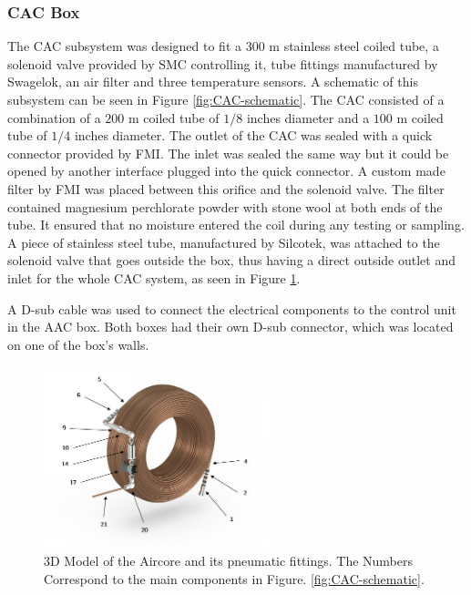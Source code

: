 \subsubsection{CAC Box}

The CAC subsystem was designed to fit a $300$ m stainless steel coiled tube, a solenoid valve provided by SMC controlling it, tube fittings manufactured by Swagelok, an air filter and three temperature sensors. A schematic of this subsystem can be seen in Figure \ref{fig:CAC-schematic}. The CAC consisted of a combination of a $200$ m coiled tube of $1/8$ inches diameter and a $100$ m coiled tube of $1/4$ inches diameter. The outlet of the CAC was sealed with a quick connector provided by FMI. The inlet was sealed the same way but it could be opened by another interface plugged into the quick connector. A custom made filter by FMI was placed between this orifice and the solenoid valve. The filter contained magnesium perchlorate powder with stone wool at both ends of the tube. It ensured that no moisture entered the coil during any testing or sampling. A piece of stainless steel tube, manufactured by Silcotek, was attached to the solenoid valve that goes outside the box, thus having a direct outside outlet and inlet for the whole CAC system, as seen in Figure \ref{fig:CAC-cad-model}.

A D-sub cable was used to connect the electrical components to the control unit in the AAC box. Both boxes had their own D-sub connector, which was located on one of the box's walls.


\begin{figure}[H]
    \centering
    \includegraphics[width=0.6\textwidth]{4-experiment-design/img/Mechanical/CAC_labels.jpg}
    \caption{3D Model of the Aircore and its pneumatic fittings. The Numbers Correspond to the main components in Figure. \ref{fig:CAC-schematic}.}
    \label{fig:CAC-cad-model}
\end{figure}

